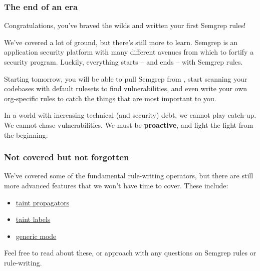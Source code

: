 \documentclass[aspectratio=169, handout]{beamer}
\begin{document}

\begin{frame}[fragile]
  \frametitle{The end of an era}

  Congratulations, you've braved the wilds and written your first Semgrep rules!

  \pause
  \vspace{\fill}

  We've covered a lot of ground, but there's still more to learn. Semgrep is an
  application security platform with many different avenues from which to
  fortify a security program. Luckily, everything starts -- and ends -- with
  Semgrep rules.

  \pause
  \vspace{\fill}

  Starting tomorrow, you will be able to pull Semgrep from , start scanning
  your codebases with default rulesets to find vulnerabilities, and even write your
  own org-specific rules to catch the things that are most important to you.

  \pause
  \vspace{\fill}

  In a world with increasing technical (and security) debt, we cannot play
  catch-up. We cannot chase vulnerabilities. We must be \textbf{proactive}, and
  fight the fight from the beginning.
\end{frame}

\begin{frame}[fragile]
  \frametitle{Not covered but not forgotten}

  We've covered some of the fundamental rule-writing operators, but there are still
  more advanced features that we won't have time to cover. These include:
  \pause
  \begin{itemize}
    \item {\color{blue}\href{https://semgrep.dev/docs/writing-rules/data-flow/taint-mode#propagators-pro}{taint propagators}}
    \item {\color{blue}\href{https://semgrep.dev/docs/writing-rules/data-flow/taint-mode#propagators-pro}{taint labels}}
    \item {\color{blue}\href{https://semgrep.dev/docs/writing-rules/generic-pattern-matching}{generic mode}}
  \end{itemize}

  \pause
  \vspace{\fill}

  Feel free to read about these, or approach with any questions on Semgrep rules or rule-writing.
\end{frame}
\end{document}
